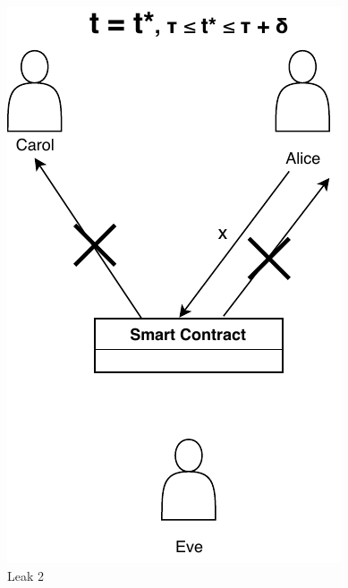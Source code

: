 \begin{figure}[H]
\begin{minipage}{0.4\textwidth}
		\includegraphics[width=.7\linewidth]{images/chap_protocollo/base-leak-2.pdf}
		\caption{Leak 2}
	\end{minipage}
\end{figure}


